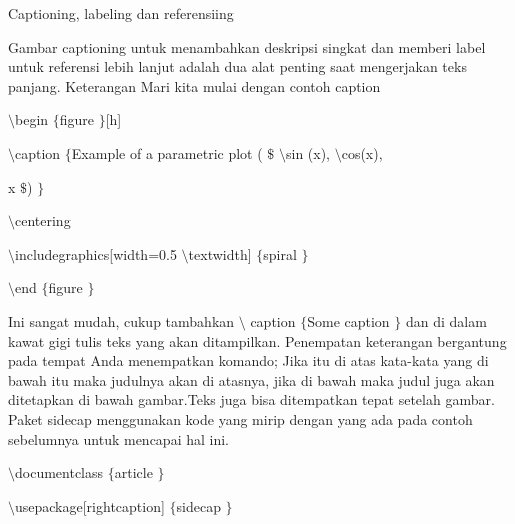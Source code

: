 \vspace{12pt}
\vspace{12pt}
\vspace{16pt}
\noindent 
Captioning, labeling dan referensiing \par
\vspace{12pt}
\noindent 
Gambar captioning untuk menambahkan deskripsi singkat dan memberi label untuk referensi lebih lanjut adalah dua alat penting saat mengerjakan teks panjang. Keterangan Mari kita mulai dengan contoh caption \par
\vspace{36pt}
\noindent 
 $  \setminus $begin $  \{  $figure $  \}  $[h] \par
\vspace{12pt}
\noindent 
 $  \setminus $caption $  \{  $Example of a parametric plot ( $  \$  $ $  \setminus $sin (x),  $  \setminus $cos(x), \par
\vspace{12pt}
\noindent 
 x $  \$  $) $  \}  $ \par
\vspace{12pt}
\noindent 
 $  \setminus $centering \par
\vspace{12pt}
\noindent 
 $  \setminus $includegraphics[width=0.5 $  \setminus $textwidth] $  \{  $spiral $  \}  $ \par
\vspace{12pt}
\noindent 
 $  \setminus $end $  \{  $figure $  \}  $ \par
\vspace{12pt}
\vspace{16pt}
\noindent 
 \hspace*{0.5in} Ini sangat mudah, cukup tambahkan  $  \setminus $ caption  $  \{  $Some caption $  \}  $ dan di dalam kawat gigi tulis teks yang akan ditampilkan. Penempatan keterangan bergantung pada tempat Anda menempatkan komando; Jika itu di atas kata-kata yang di bawah itu maka judulnya akan di atasnya, jika di bawah maka judul juga akan ditetapkan di bawah gambar.Teks juga bisa ditempatkan tepat setelah gambar. Paket sidecap menggunakan kode yang mirip dengan yang ada pada contoh sebelumnya untuk mencapai hal ini. \par
\vspace{16pt}
\vspace{16pt}
\noindent 
 $  \setminus $documentclass $  \{  $article $  \}  $ \par
\vspace{12pt}
\noindent 
 $  \setminus $usepackage[rightcaption] $  \{  $sidecap $  \}  $ \par
